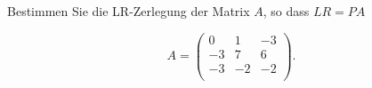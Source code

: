 \newpage

\subsubsection{} %
Bestimmen Sie die LR-Zerlegung der Matrix \( A \), so dass \( LR = PA \)

\begin{equation*}
    A = \begin{pmatrix}
    0 & 1 & -3 \\
    -3 & 7 & 6 \\
    -3 & -2 & -2 \\
    \end{pmatrix}.
\end{equation*}

\vspace{1\baselineskip}

